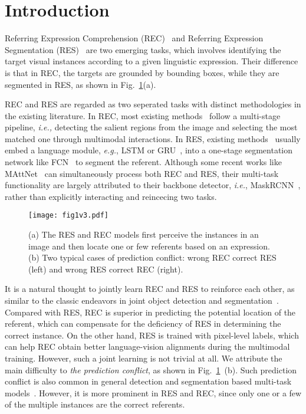 \documentclass[10pt,twocolumn,letterpaper]{article}
\begin{document}
\section{Introduction}

Referring Expression Comprehension (REC)~\cite{hu2017modeling,hu2016natural,liu2017referring,luo2017comprehension-guided,yu2016modeling,yu2017a,zhang2017discriminative,yu2018mattnet:,wang2019neighbourhood} and Referring Expression Segmentation (RES)~\cite{LSTM-CNN,RRN,CMSA,DMN,KWA} are two   emerging  tasks, which involves identifying  the target  visual  instances according to a given  linguistic  expression. 
Their difference is  that in REC, the targets are grounded by bounding boxes, while   they are segmented in RES,  as shown in Fig.~\ref{fig1}(a).  

REC and RES are  regarded as two seperated tasks  with distinct  methodologies  in the existing literature.
In REC, most existing methods~\cite{hu2017modeling,hu2016natural,liu2017referring,luo2017comprehension-guided,mao2016generation,yu2016modeling,yu2017a,yu2018rethinking,zhang2017discriminative} follow a multi-stage pipeline, \emph{i.e.,}  detecting the salient regions from the image and selecting the most matched one through multimodal interactions.
In RES, existing methods~\cite{LSTM-CNN,RRN} usually embed a language module, \emph{e.g.}, LSTM or GRU~\cite{GRU}, into a  one-stage segmentation network like FCN~\cite{FCN} to segment the referent. 
Although some recent works like MAttNet~\cite{MATT:} can  simultaneously process  both REC and RES,  their multi-task functionality are largely attributed to their backbone detector, \emph{i.e.}, MaskRCNN~\cite{MATT:}, rather than explicitly interacting and reincecing  two tasks.

\begin{figure}[t]
	\centering
	\texttt{[image: fig1v3.pdf]}
\caption{(a) The RES and REC models first perceive the instances in an image and then locate one or few referents based on an expression.  (b)  Two typical cases of prediction conflict: wrong REC correct RES (left) and wrong RES correct REC (right).}
	\label{fig1} 
\vspace{-1em}
\end{figure}
It is a natural thought to jointly learn REC and RES to reinforce 
each other, as similar to the classic endeavors in joint object detection and segmentation~\cite{fu2019retinamask,he2017mask,dvornik2017blitznet}.
Compared with RES, REC is superior in predicting the potential location of the referent, which can compensate for the deficiency of RES in determining  the correct instance. 
On the other hand, RES is trained with pixel-level labels, which can  help REC obtain better language-vision alignments during the multimodal training. However, such a joint learning is not trivial at all. We attribute the main difficulty to \emph{the prediction conflict}, as shown in Fig.~\ref{fig1}~(b). Such  prediction conflict is also common in general detection and segmentation based multi-task models~\cite{he2017mask,eigen2015predicting,chen2018driving}. However, it is more prominent in RES and REC, since only one or a few of the multiple instances are the correct referents. 
\end{document}
